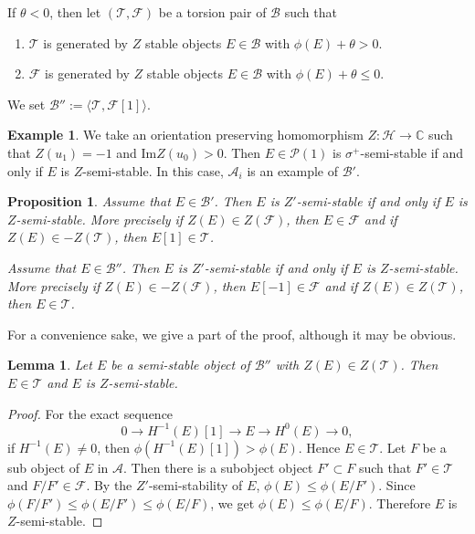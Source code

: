 \documentclass[leqno,11pt]{amsart}
\def\C{\ensuremath{\mathbb{C}}}
\newtheorem{Prop}[Thm]{Proposition}
\newtheorem{Lem}[Thm]{Lemma}
\theoremstyle{definition}
\newtheorem{Ex}[Thm]{Example}
\def\C{\ensuremath{\mathbb{C}}}
\def\AA{\ensuremath{\mathcal A}}
\def\BB{\ensuremath{\mathcal B}}
\def\FF{\ensuremath{\mathcal F}}
\def\HH{\ensuremath{\mathcal H}}
\def\PP{\ensuremath{\mathcal P}}
\def\TT{\ensuremath{\mathcal T}}
\begin{document}
If $\theta < 0$, then
let $(\TT,\FF)$ be a torsion pair of $\BB$
such that
\begin{enumerate}
\item
$\TT$ is generated by $Z$ stable objects $E \in \BB$ with
$\phi(E)+\theta>0$. 
\item
$\FF$ is generated by $Z$ stable objects $E \in \BB$ with
$\phi(E)+\theta \leq 0$. 
\end{enumerate}
We set $\BB'':=\langle \TT,\FF[1] \rangle$.



\begin{Ex}
We take an orientation preserving homomorphism 
$Z:\HH \to \C$ such that $Z(u_1)=-1$ and $\mathrm{Im} Z(u_0) >0$.
Then $E \in \PP(1)$ is $\sigma^+$-semi-stable if and only if
$E$ is $Z$-semi-stable.
In this case, $\AA_i$ is an example of $\BB'$. 
\end{Ex}

 

\begin{Prop}\label{Prop:BB}
Assume that $E\in \BB'$.
Then $E$ is $Z'$-semi-stable if and only if $E$ is $Z$-semi-stable.
More precisely if $Z(E) \in Z(\FF)$, then $E \in \FF$ and
if $Z(E) \in -Z(\TT)$, then $E[1] \in \TT$.

Assume that $E\in \BB''$.
Then $E$ is $Z'$-semi-stable if and only if $E$ is $Z$-semi-stable.
More precisely if $Z(E) \in -Z(\FF)$, then $E[-1] \in \FF$ and
if $Z(E) \in Z(\TT)$, then $E \in \TT$.
\end{Prop}

For a convenience sake, we give a part of the proof,
although it may be obvious.


\begin{Lem}
Let $E$ be a semi-stable object of $\BB''$ with $Z(E) \in Z(\TT)$.
Then $E \in \TT$ and $E$ is $Z$-semi-stable.
\end{Lem}

\begin{proof}
For the exact sequence
\begin{equation}
0 \to H^{-1}(E)[1] \to E \to H^0(E) \to 0,
\end{equation}
if $H^{-1}(E) \ne 0$, then $\phi(H^{-1}(E)[1])>\phi(E)$.
Hence $E \in \TT$.
Let $F$ be a sub object of $E$ in $\AA$.
Then there is a subobject object $F' \subset F$ such that
$F' \in \TT$ and $F/F' \in \FF$.
By the $Z'$-semi-stability of $E$, 
$\phi(E) \leq \phi(E/F')$.
Since $\phi(F/F') \leq \phi(E/F') \leq \phi(E/F)$,
we get $\phi(E) \leq \phi(E/F)$.
Therefore $E$ is $Z$-semi-stable.
\end{proof}
\end{document}
